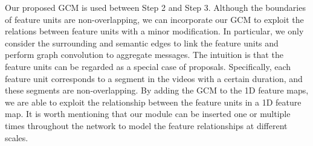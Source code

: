 \documentclass[10pt,journal,compsoc]{IEEEtran}
\begin{document}
	Our proposed GCM is used between Step 2 and Step 3. 
	Although the boundaries of feature units are non-overlapping, we can incorporate our GCM to exploit the relations between feature units with a minor modification. 
	In particular, we only consider the surrounding and semantic edges to link the feature units and perform graph convolution to aggregate messages. The intuition is that the feature units can be regarded as a special case of proposals. Specifically, each feature unit corresponds to a segment in the videos with a certain duration, and these segments are non-overlapping. By adding the GCM to the 1D feature maps, we are able to exploit the relationship between the feature units in a 1D feature map. 
	It is worth mentioning that our module can be inserted one or multiple times throughout the network to model the feature relationships at different scales.
	
	
	
	
	
	
	
	
\end{document}
